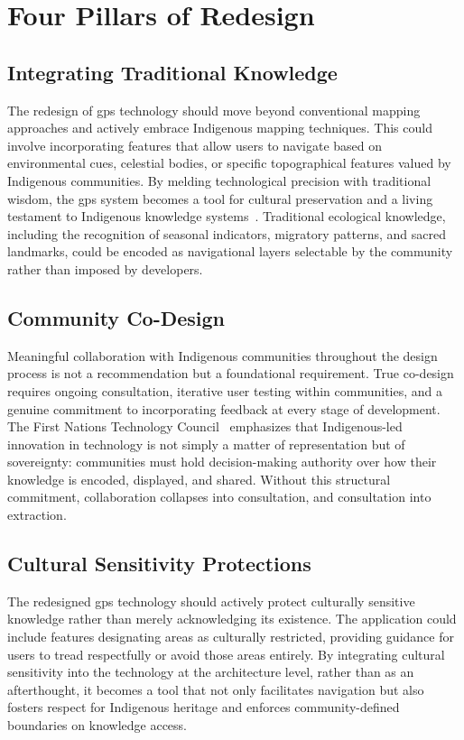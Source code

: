 \documentclass[11pt,showkeys]{essay}
\begin{document}
\section{Four Pillars of Redesign}

\subsection{Integrating Traditional Knowledge}

The redesign of \gls{gps} technology should move beyond conventional mapping approaches and actively embrace Indigenous mapping techniques. This could involve incorporating features that allow users to navigate based on environmental cues, celestial bodies, or specific topographical features valued by Indigenous communities. By melding technological precision with traditional wisdom, the \gls{gps} system becomes a tool for cultural preservation and a living testament to Indigenous knowledge systems~\cite{handayani_integrating_2023}. Traditional ecological knowledge, including the recognition of seasonal indicators, migratory patterns, and sacred landmarks, could be encoded as navigational layers selectable by the community rather than imposed by developers.

\subsection{Community Co-Design}

Meaningful collaboration with Indigenous communities throughout the design process is not a recommendation but a foundational requirement. True co-design requires ongoing consultation, iterative user testing within communities, and a genuine commitment to incorporating feedback at every stage of development. The First Nations Technology Council~\cite{council_why_2022} emphasizes that Indigenous-led innovation in technology is not simply a matter of representation but of sovereignty: communities must hold decision-making authority over how their knowledge is encoded, displayed, and shared. Without this structural commitment, collaboration collapses into consultation, and consultation into extraction.

\subsection{Cultural Sensitivity Protections}

The redesigned \gls{gps} technology should actively protect culturally sensitive knowledge rather than merely acknowledging its existence. The application could include features designating areas as culturally restricted, providing guidance for users to tread respectfully or avoid those areas entirely. By integrating cultural sensitivity into the technology at the architecture level, rather than as an afterthought, it becomes a tool that not only facilitates navigation but also fosters respect for Indigenous heritage and enforces community-defined boundaries on knowledge access.
\end{document}
